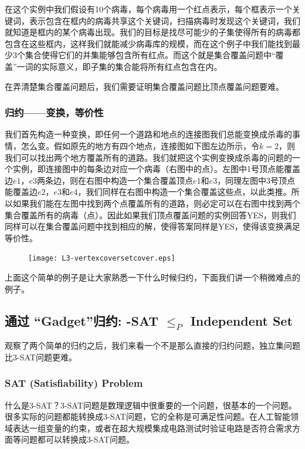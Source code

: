 在这个实例中我们假设有10个病毒，每个病毒用一个红点表示，每个框表示一个关键词，表示包含在框内的病毒共享这个关键词，扫描病毒时发现这个关键词，我们就知道是框内的某个病毒出现。我们的目标是找尽可能少的子集使得所有的病毒都包含在这些框内，这样我们就能减少病毒库的规模，而在这个例子中我们能找到最少3个集合使得它们的并集能够包含所有红点。而这个就是集合覆盖问题中“覆盖”一词的实际意义，即子集的集合能将所有红点包含在内。

在弄清楚集合覆盖问题后，我们需要证明集合覆盖问题比顶点覆盖问题要难。

\subsubsection{归约——变换，等价性}

我们首先构造一种变换，即任何一个道路和地点的连接图我们总能变换成杀毒的事情，怎么变。假如原先的地方有四个地点，连接图如下图左边所示，令$k=2$，则我们可以找出两个地方覆盖所有的道路。我们就把这个实例变换成杀毒的问题的一个实例，即连接图中的每条边对应一个病毒（右图中的点）。左图中1号顶点能覆盖边$e1$，$e3$两条边，则在右图中构造一个集合覆盖顶点$e1$和$e3$，同理左图中3号顶点能覆盖边$e2$，$e3$和$e4$，我们同样在右图中构造一个集合覆盖这些点，以此类推。所以如果我们能在左图中找到两个点覆盖所有的道路，则必定可以在右图中找到两个集合覆盖所有的病毒（点）。因此如果我们顶点覆盖问题的实例回答YES，则我们同样可以在集合覆盖问题中找到相应的解，使得答案同样是YES，使得该变换满足等价性。

\begin{figure}[H]
	\centering
	\texttt{[image: L3-vertexcoversetcover.eps]}
\end{figure}

上面这个简单的例子是让大家熟悉一下什么时候归约，下面我们讲一个稍微难点的例子。

\subsection{通过 ``Gadget''归约: {-SAT} $\le_P$ {\sc Independent Set}}

观察了两个简单的归约之后，我们来看一个不是那么直接的归约问题，独立集问题比3-SAT问题更难。

\subsubsection{{ SAT (Satisfiability)} Problem}

什么是3-SAT？3-SAT问题是数理逻辑中很重要的一个问题，很基本的一个问题。很多实际的问题都能转换成3-SAT问题，它的全称是可满足性问题。在人工智能领域表达一组变量的约束，或者在超大规模集成电路测试时验证电路是否符合需求方面等问题都可以转换成3-SAT问题。

